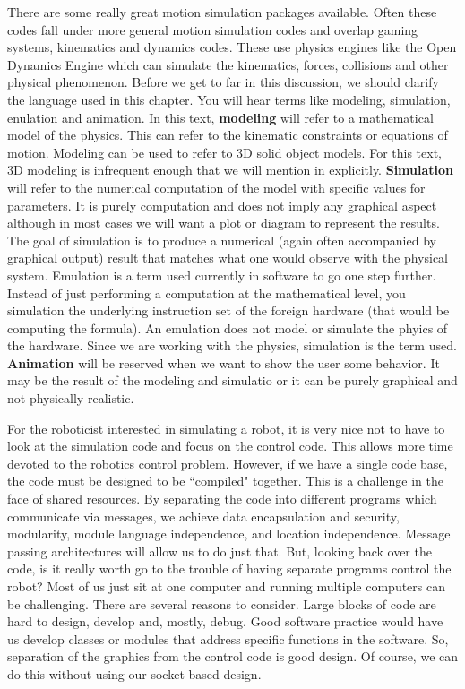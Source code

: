 There are some really great motion simulation packages available. Often
these codes fall under more general motion simulation codes and overlap
gaming systems, kinematics and dynamics codes. These use physics engines
like the Open Dynamics Engine which can simulate the kinematics, forces,
collisions and other physical phenomenon. Before we get to far in this
discussion, we should clarify the language used in this chapter. You
will hear terms like modeling, simulation, enulation and animation. In
this text, \textbf{modeling} will refer to a mathematical model of the
physics. This can refer to the kinematic constraints or equations of
motion. Modeling can be used to refer to 3D solid object models. For
this text, 3D modeling is infrequent enough that we will mention in
explicitly. \textbf{Simulation} will refer to the numerical computation
of the model with specific values for parameters. It is purely
computation and does not imply any graphical aspect although in most
cases we will want a plot or diagram to represent the results. The goal
of simulation is to produce a numerical (again often accompanied by
graphical output) result that matches what one would observe with the
physical system. Emulation is a term used currently in software to go
one step further. Instead of just performing a computation at the
mathematical level, you simulation the underlying instruction set of the
foreign hardware (that would be computing the formula). An emulation
does not model or simulate the phyics of the hardware. Since we are
working with the physics, simulation is the term used.
\textbf{Animation} will be reserved when we want to show the user some
behavior. It may be the result of the modeling and simulatio or it can
be purely graphical and not physically realistic.

For the roboticist interested in simulating a robot, it is very nice not
to have to look at the simulation code and focus on the control code.
This allows more time devoted to the robotics control problem. However,
if we have a single code base, the code must be designed to be
``compiled" together. This is a challenge in the face of shared
resources. By separating the code into different programs which
communicate via messages, we achieve data encapsulation and security,
modularity, module language independence, and location independence.
Message passing architectures will allow us to do just that. But,
looking back over the code, is it really worth go to the trouble of
having separate programs control the robot? Most of us just sit at one
computer and running multiple computers can be challenging. There are
several reasons to consider. Large blocks of code are hard to design,
develop and, mostly, debug. Good software practice would have us develop
classes or modules that address specific functions in the software. So,
separation of the graphics from the control code is good design. Of
course, we can do this without using our socket based design.

